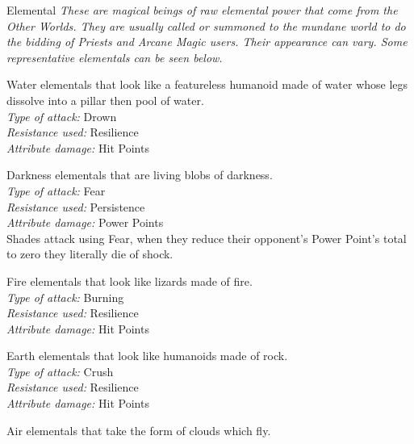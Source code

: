 \begin{monsterbox}{Elemental}
\label{monster:elemental}
	\textit{These are magical beings of raw elemental power that come from the Other Worlds. They are usually called or summoned to the mundane world to do the bidding of Priests and Arcane Magic users. Their appearance can vary. Some representative elementals can be seen below.}\\
	\rpghline
	\begin{rpg-monsteraction}[Undines]
		Water elementals that look like a featureless humanoid made of water whose legs dissolve into a pillar then pool of water.\\
		\textit{Type of attack:} Drown\\
		\textit{Resistance used:} Resilience\\
		\textit{Attribute damage:} Hit Points
	\end{rpg-monsteraction}
	\begin{rpg-monsteraction}[Shades]
    		Darkness elementals that are living blobs of darkness.\\
		\textit{Type of attack:} Fear\\
		\textit{Resistance used:} Persistence\\
		\textit{Attribute damage:} Power Points\\
		Shades attack using Fear, when they reduce their opponent’s Power Point’s total to zero they literally die of shock.
	\end{rpg-monsteraction}
	\begin{rpg-monsteraction}[Salamanders]
		Fire elementals that look like lizards made of fire.\\
		\textit{Type of attack:} Burning\\
		\textit{Resistance used:} Resilience\\
		\textit{Attribute damage:} Hit Points
	\end{rpg-monsteraction}
	\begin{rpg-monsteraction}[Gnomes]
		Earth elementals that look like humanoids made of rock.\\
		\textit{Type of attack:} Crush\\
		\textit{Resistance used:} Resilience\\
		\textit{Attribute damage:} Hit Points
	\end{rpg-monsteraction}
	\begin{rpg-monsteraction}[Sylphs]
		Air elementals that take the form of clouds which fly.\\

\end{rpg-monsteraction}
\end{monsterbox}
